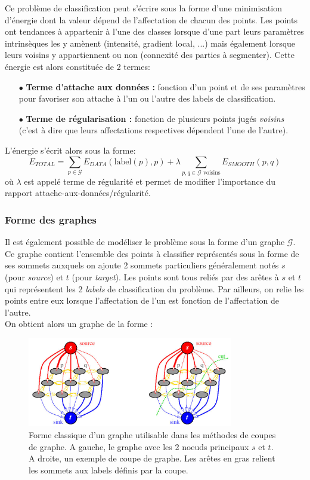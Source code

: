 \documentclass{article}
\newcommand{\lab}{\text{label}}
\begin{document}
Ce problème de classification peut s'écrire sous la forme d'une minimisation d'énergie dont la valeur dépend de l'affectation de chacun des points. Les points ont tendances à appartenir à l'une des classes lorsque d'une part leurs paramètres intrinsèques les y amènent (intensité, gradient local, ...) mais également lorsque leurs voisins y appartiennent ou non (connexité des parties à segmenter). Cette énergie est alors constituée de 2 termes:
\begin{itemize}
	\item[$\bullet$]\textbf{Terme d'attache aux données :} fonction d'un point et de ses paramètres pour favoriser son attache à l'un ou l'autre des labels de classification.
	\item[$\bullet$]\textbf{Terme de régularisation :} fonction de plusieurs points jugés \textit{voisins} (c'est à dire que leurs affectations respectives dépendent l'une de l'autre).
\end{itemize}
L'énergie s'écrit alors sous la forme:
\[
	E_{TOTAL} = \sum_{p \in \mathcal{G}} E_{DATA}(\lab(p), p) + \lambda \sum _{p,q \in \mathcal{G} \text{ voisins}} E_{SMOOTH}(p,q)
\]
où $\lambda$ est appelé terme de régularité et permet de modifier l'importance du rapport attache-aux-données/régularité.\\

\subsubsection{Forme des graphes}

Il est également possible de modéliser le problème sous la forme d'un graphe $\mathcal{G}$. Ce graphe contient l'ensemble des points à classifier représentés sous la forme de ses sommets auxquels on ajoute 2 sommets particuliers généralement notés $s$ (pour \textit{source}) et $t$ (pour \textit{target}). Les points sont tous reliés par des arêtes à $s$ et $t$ qui représentent les 2 \textit{labels} de classification du problème. Par ailleurs, on relie les points entre eux lorsque l'affectation de l'un est fonction de l'affectation de l'autre.\\
On obtient alors un graphe de la forme : 
\begin{figure}[!h]
	\begin{center}
		\includegraphics[width=0.8\textwidth]{Images/GC/graphcut.png} 
	\end{center}
	\caption{Forme classique d'un graphe utilisable dans les méthodes de coupes de graphe. A gauche, le graphe avec les 2 noeuds principaux $s$ et $t$. A droite, un exemple de coupe de graphe. Les arêtes en gras relient les sommets aux labels définis par la coupe.}
	\label{fig:GC_graphe}
\end{figure}
\end{document}
